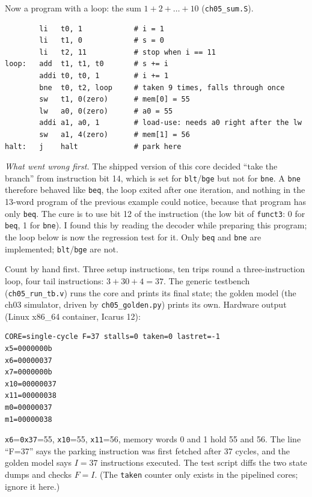 \begin{example}\label{ex:loop05}
Now a program with a loop: the sum $1+2+\dots+10$ (\texttt{ch05\_sum.S}).
\begin{lstlisting}
        li   t0, 1            # i = 1
        li   t1, 0            # s = 0
        li   t2, 11           # stop when i == 11
loop:   add  t1, t1, t0       # s += i
        addi t0, t0, 1        # i += 1
        bne  t0, t2, loop     # taken 9 times, falls through once
        sw   t1, 0(zero)      # mem[0] = 55
        lw   a0, 0(zero)      # a0 = 55
        addi a1, a0, 1        # load-use: needs a0 right after the lw
        sw   a1, 4(zero)      # mem[1] = 56
halt:   j    halt             # park here
\end{lstlisting}
\emph{What went wrong first.} The shipped version of this core
decided ``take the branch'' from instruction bit 14, which is set for
\texttt{blt}/\texttt{bge} but not for \texttt{bne}. A \texttt{bne}
therefore behaved like \texttt{beq}, the loop exited after one
iteration, and nothing in the 13-word program of the previous example
could notice, because that program has only \texttt{beq}. The cure is to
use bit 12 of the instruction (the low bit of \texttt{funct3}:
0 for \texttt{beq}, 1 for \texttt{bne}). I found this by reading the
decoder while preparing this program; the loop below is now the
regression test for it. Only \texttt{beq} and \texttt{bne} are
implemented; \texttt{blt}/\texttt{bge} are not.

Count by hand first. Three setup instructions, ten trips round a
three-instruction loop, four tail instructions: $3+30+4=37$. The
generic testbench (\texttt{ch05\_run\_tb.v}) runs the core and
prints its final state; the golden model (the ch03 simulator, driven
by \texttt{ch05\_golden.py}) prints its own. Hardware output
(Linux x86\_64 container, Icarus 12):
\begin{lstlisting}
CORE=single-cycle F=37 stalls=0 taken=0 lastret=-1
x5=0000000b
x6=00000037
x7=0000000b
x10=00000037
x11=00000038
m0=00000037
m1=00000038
\end{lstlisting}
\texttt{x6}=\texttt{0x37}=55, \texttt{x10}=55, \texttt{x11}=56, memory
words 0 and 1 hold 55 and 56. The line ``F=37'' says the parking
instruction was first fetched after 37 cycles, and the golden model
says $I=37$ instructions executed. The test script diffs the two
state dumps and checks $F=I$. (The \texttt{taken} counter only
exists in the pipelined cores; ignore it here.)
\end{example}

